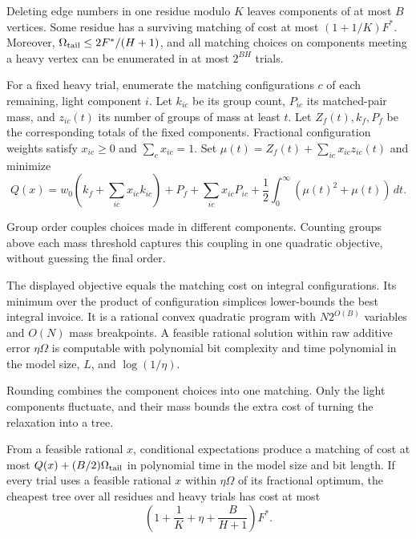 \begin{proposition}
\label{prop:pair-deletion-heavy}
Deleting edge numbers in one residue modulo $K$ leaves components of
at most $B$ vertices. Some residue has a surviving matching of cost
at most $(1+1/K)F^*$. Moreover,
$\Omega_{\rm tail}\le2F^*/(H+1)$, and all matching choices on components
meeting a heavy vertex can be enumerated in at most $2^{BH}$ trials.
\end{proposition}

For a fixed heavy trial, enumerate the matching configurations $c$ of
each remaining, light component $i$. Let $k_{ic}$ be its group count,
$P_{ic}$ its matched-pair mass, and $z_{ic}(t)$ its number of groups
of mass at least $t$. Let $Z_f(t),k_f,P_f$ be the corresponding totals
of the fixed components. Fractional configuration weights satisfy
$x_{ic}\ge0$ and $\sum_cx_{ic}=1$. Set
$\mu(t)=Z_f(t)+\sum_{ic}x_{ic}z_{ic}(t)$ and minimize
\begin{equation}\label{eq:pair-convex-relaxation}
 Q(x)=w_0\left(k_f+\sum_{ic}x_{ic}k_{ic}\right)
       +P_f+\sum_{ic}x_{ic}P_{ic}
       +\frac12\int_0^\infty(\mu(t)^2+\mu(t))\,dt.
\end{equation}

Group order couples choices made in different components. Counting
groups above each mass threshold captures this coupling in one
quadratic objective, without guessing the final order.

\begin{proposition}
\label{prop:pair-convex-model}
The displayed objective equals the matching cost on integral
configurations. Its minimum over the product of configuration simplices
lower-bounds the best integral invoice. It is a rational convex quadratic program
with $N2^{O(B)}$ variables and $O(N)$ mass breakpoints. A feasible
rational solution within raw additive error $\eta\Omega$ is computable
with polynomial bit complexity and time polynomial in the model size,
$L$, and $\log(1/\eta)$.
\end{proposition}

Rounding combines the component choices into one matching. Only the
light components fluctuate, and their mass bounds the extra cost of
turning the relaxation into a tree.

\begin{proposition}
\label{prop:pair-rounding}
From a feasible rational $x$, conditional expectations produce a matching of
cost at most $Q(x)+(B/2)\Omega_{\rm tail}$ in polynomial time in the
model size and bit length. If every trial uses a feasible rational $x$
within $\eta\Omega$ of its fractional optimum, the cheapest tree over all
residues and heavy trials has cost at most
\[
 \left(1+\frac1K+\eta+\frac B{H+1}\right)F^*.
\]
\end{proposition}

